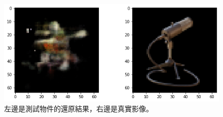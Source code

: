 \documentclass[10pt,twocolumn,letterpaper]{article}
\begin{document}
\begin{CJK}{UTF8}{bkai}
\begin{figure}
\begin{center}
         \includegraphics[width=1\linewidth]{img/experiment/test_4.png}
      \end{center}
      \caption{
         左邊是測試物件的還原結果，右邊是真實影像。
      }
      \label{fig:test_results}
   \end{figure}
\end{CJK}
\end{document}
